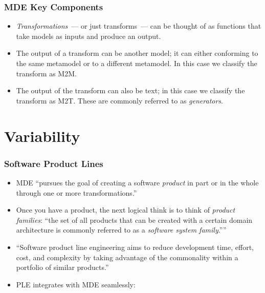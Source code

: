 \documentclass{beamer}
\begin{document}
\begin{frame}
\frametitle{\ac{MDE} Key Components}

\begin{itemize}

\item \emph{Transformations}~--- or just transforms~--- can be thought
  of as functions that take models as inputs and produce an output.

\pause

\item The output of a transform can be another model; it can either
  conforming to the same metamodel or to a different metamodel. In
  this case we classify the transform as \ac{M2M}.

\pause

\item The output of the transform can also be text; in this case we
  classify the transform as \ac{M2T}. These are commonly referred to
  as \emph{generators}.

\end{itemize}

\end{frame}

\section{Variability}

\begin{frame}
\frametitle{Software Product Lines}

\begin{itemize}

\item \ac{MDE} ``pursues the goal of creating a software
  \emph{product} in part or in the whole through one or more
  transformations.''\cite{völter2013model}

\pause

\item Once you have a product, the next logical think is to think of
  \emph{product families}: ``the set of all products that can be
  created with a certain domain architecture is commonly referred to
  as a \emph{software system family}.''''\cite{volter2013model}

\pause

\item ``Software product line engineering aims to reduce development
  time, effort, cost, and complexity by taking advantage of the
  commonality within a portfolio of similar
  products.''\cite{voelter2007handling}

\pause

\item \ac{PLE} integrates with \ac{MDE} seamlessly:

\end{itemize}

\end{frame}
\end{document}
